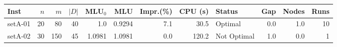 \begin{tabular}{lrrrrrrrlrrr}
\hline
Inst & $n$ & $m$ & $|D|$ & MLU$_0$ & MLU & Impr.(\%) & CPU (s) & Status & Gap & Nodes & Runs \\\hline
setA-01 & 20 & 80 & 40 & 1.0 & 0.9294 & 7.1 & 30.5 & Optimal & 0.0 & 1.0 & 10 \\
setA-02 & 30 & 150 & 45 & 1.0981 & 1.0981 & 0.0 & 120.2 & Not Optimal & 1.0 & 0.0 & 1 \\
\hline
\end{tabular}
